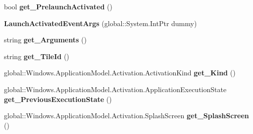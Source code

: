 \begin{DoxyCompactItemize}
bool {\bfseries get\+\_\+\+Prelaunch\+Activated} ()
\item 
\mbox{\label{class_windows_1_1_application_model_1_1_activation_1_1_launch_activated_event_args_a16f7ab7f04a1992d706c870058f3cc71}} 
{\bfseries Launch\+Activated\+Event\+Args} (global\+::\+System.\+Int\+Ptr dummy)
\item 
\mbox{\label{class_windows_1_1_application_model_1_1_activation_1_1_launch_activated_event_args_a2f0e833400f9a526d769829a2929be6e}} 
string {\bfseries get\+\_\+\+Arguments} ()
\item 
\mbox{\label{class_windows_1_1_application_model_1_1_activation_1_1_launch_activated_event_args_abfe42f834df00c44cb26f19ea3df1f47}} 
string {\bfseries get\+\_\+\+Tile\+Id} ()
\item 
\mbox{\label{class_windows_1_1_application_model_1_1_activation_1_1_launch_activated_event_args_a8a1941039506449bd08dae63fe6deaaa}} 
global\+::\+Windows.\+Application\+Model.\+Activation.\+Activation\+Kind {\bfseries get\+\_\+\+Kind} ()
\item 
\mbox{\label{class_windows_1_1_application_model_1_1_activation_1_1_launch_activated_event_args_acf63cfda1c3de4f08983a4af7c24697b}} 
global\+::\+Windows.\+Application\+Model.\+Activation.\+Application\+Execution\+State {\bfseries get\+\_\+\+Previous\+Execution\+State} ()
\item 
\mbox{\label{class_windows_1_1_application_model_1_1_activation_1_1_launch_activated_event_args_a971bc89f3d06dc11ddb57e25333dcb8a}} 
global\+::\+Windows.\+Application\+Model.\+Activation.\+Splash\+Screen {\bfseries get\+\_\+\+Splash\+Screen} ()
\item 
\mbox{\label{class_windows_1_1_application_model_1_1_activation_1_1_launch_activated_event_args_a0e1e0d199b725ce3e4aeb5f0c33874c2}} 

\end{DoxyCompactItemize}
